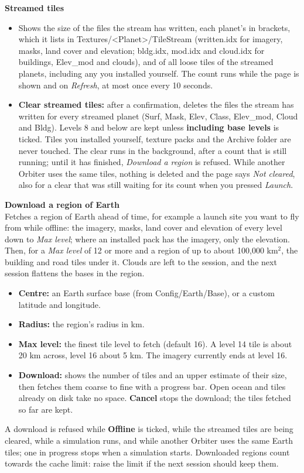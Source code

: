 \documentclass[Orbiter User Manual.tex]{subfiles}
\begin{document}
\noindent
\textbf{Streamed tiles}
\begin{itemize}
\item Shows the size of the files the stream has written, each planet's in brackets, which it lists in Textures/<Planet>/TileStream (written.idx for imagery, masks, land cover and elevation; bldg.idx, mod.idx and cloud.idx for buildings, Elev\_mod and clouds), and of all loose tiles of the streamed planets, including any you installed yourself. The count runs while the page is shown and on \textit{Refresh}, at most once every 10 seconds.
\item \textbf{Clear streamed tiles:} after a confirmation, deletes the files the stream has written for every streamed planet (Surf, Mask, Elev, Class, Elev\_mod, Cloud and Bldg). Levels 8 and below are kept unless \textbf{including base levels} is ticked. Tiles you installed yourself, texture packs and the Archive folder are never touched. The clear runs in the background, after a count that is still running; until it has finished, \textit{Download a region} is refused. While another Orbiter uses the same tiles, nothing is deleted and the page says \textit{Not cleared}, also for a clear that was still waiting for its count when you pressed \textit{Launch}.
\end{itemize}

\noindent
\textbf{Download a region of Earth}\\
Fetches a region of Earth ahead of time, for example a launch site you want to fly from while offline: the imagery, masks, land cover and elevation of every level down to \textit{Max level}; where an installed pack has the imagery, only the elevation. Then, for a \textit{Max level} of 12 or more and a region of up to about 100,000 km$^2$, the building and road tiles under it. Clouds are left to the session, and the next session flattens the bases in the region.
\begin{itemize}
\item \textbf{Centre:} an Earth surface base (from Config/Earth/Base), or a custom latitude and longitude.
\item \textbf{Radius:} the region's radius in km.
\item \textbf{Max level:} the finest tile level to fetch (default 16). A level 14 tile is about 20 km across, level 16 about 5 km. The imagery currently ends at level 16.
\item \textbf{Download:} shows the number of tiles and an upper estimate of their size, then fetches them coarse to fine with a progress bar. Open ocean and tiles already on disk take no space. \textbf{Cancel} stops the download; the tiles fetched so far are kept.
\end{itemize}
A download is refused while \textbf{Offline} is ticked, while the streamed tiles are being cleared, while a simulation runs, and while another Orbiter uses the same Earth tiles; one in progress stops when a simulation starts. Downloaded regions count towards the cache limit: raise the limit if the next session should keep them.\\
\end{document}
